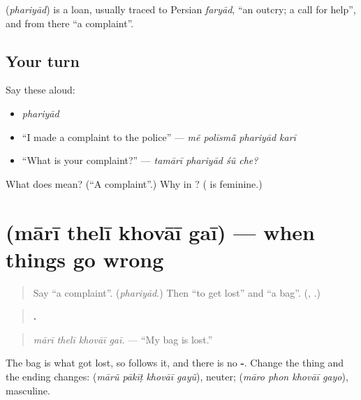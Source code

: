 \begin{cousinweb}
\textbf{} (\emph{phariyād}) is a loan, usually traced to Persian \emph{faryād}, \textquotedblleft{}an outcry; a call for help\textquotedblright{}, and from there \textquotedblleft{}a complaint\textquotedblright{}.
\end{cousinweb}

\subsection*{Your turn}
Say these aloud:

\begin{itemize}
\raggedright
  \item \emph{phariyād}
  \item \textquotedblleft{}I made a complaint to the police\textquotedblright{} — \emph{mẽ polīsmā̃ phariyād karī}
  \item \textquotedblleft{}What is your complaint?\textquotedblright{} — \emph{tamārī phariyād śũ che?}
\end{itemize}

\begin{tcolorbox}[breakable,colback=teal!4,colframe=teal!35!black,title={Before you move on}]
What does \textbf{} mean? (\textquotedblleft{}A complaint\textquotedblright{}.) Why \textbf{} in \textbf{  }? (\textbf{} is feminine.)
\end{tcolorbox}
\section[\texorpdfstring{\gu{મારી} \gu{થેલી} \gu{ખોવાઈ} \gu{ગઈ} (mārī thelī …)}{મારી થેલી ખોવાઈ ગઈ (mārī thelī …)}]{    (mārī thelī khovāī gaī) — when things go wrong}

\label{lesson:GU-C280-khovai-gai}



\begin{quote}
Say \textquotedblleft{}a complaint\textquotedblright{}. (\emph{phariyād}.) Then \textquotedblleft{}to get lost\textquotedblright{} and \textquotedblleft{}a bag\textquotedblright{}. (\textbf{}, \textbf{}.)
\end{quote}

\begin{grammarlens}[title={Grammar Lens: the lost thing is the subject}]
\begin{quote}
\textbf{   .}
\end{quote}

\begin{quote}
\emph{mārī thelī khovāī gaī.} — \textquotedblleft{}My bag is lost.\textquotedblright{}
\end{quote}

The bag is what got lost, so \textbf{} follows it, and there is no \textbf{-}. Change the thing and the ending changes: \textbf{   } (\emph{mārũ pākīṭ khovāī gayũ}), neuter; \textbf{   } (\emph{māro phon khovāī gayo}), masculine.
\end{grammarlens}

